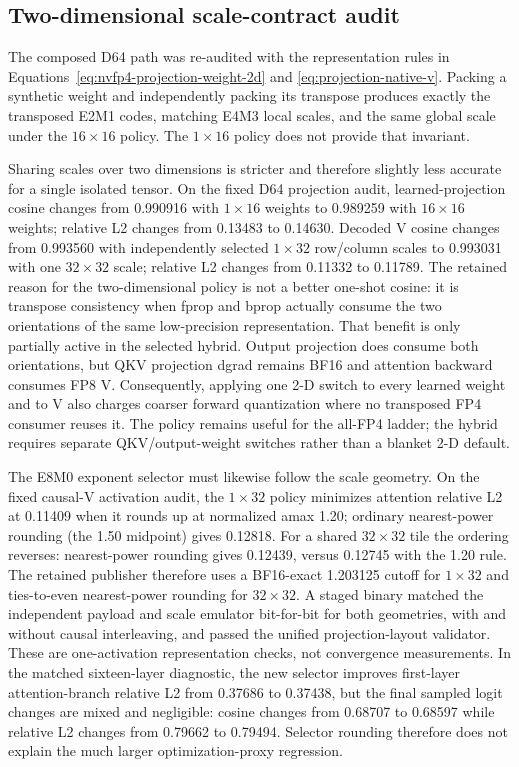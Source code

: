 \subsection{Two-dimensional scale-contract audit}

The composed D64 path was re-audited with the representation rules in
Equations~\ref{eq:nvfp4-projection-weight-2d} and
\ref{eq:projection-native-v}.  Packing a synthetic weight and independently
packing its transpose produces exactly the transposed E2M1 codes, matching
E4M3 local scales, and the same global scale under the $16\times16$ policy.
The $1\times16$ policy does not provide that invariant.

Sharing scales over two dimensions is stricter and therefore slightly less
accurate for a single isolated tensor.  On the fixed D64 projection audit,
learned-projection cosine changes from 0.990916 with $1\times16$ weights to
0.989259 with $16\times16$ weights; relative L2 changes from 0.13483 to
0.14630.  Decoded V cosine changes from 0.993560 with independently selected
$1\times32$ row/column scales to 0.993031 with one $32\times32$ scale;
relative L2 changes from 0.11332 to 0.11789.  The retained reason for the
two-dimensional policy is not a better one-shot cosine: it is transpose
consistency when fprop and bprop actually consume the two orientations of the
same low-precision representation.  That benefit is only partially active in
the selected hybrid.  Output projection does consume both orientations, but
QKV projection dgrad remains BF16 and attention backward consumes FP8 V.
Consequently, applying one 2-D switch to every learned weight and to V also
charges coarser forward quantization where no transposed FP4 consumer reuses
it.  The policy remains useful for the all-FP4 ladder; the hybrid requires
separate QKV/output-weight switches rather than a blanket 2-D default.

The E8M0 exponent selector must likewise follow the scale geometry.  On the
fixed causal-V activation audit, the $1\times32$ policy minimizes attention
relative L2 at 0.11409 when it rounds up at normalized amax 1.20; ordinary
nearest-power rounding (the 1.50 midpoint) gives 0.12818.  For a shared
$32\times32$ tile the ordering reverses: nearest-power rounding gives 0.12439,
versus 0.12745 with the 1.20 rule.  The retained publisher therefore uses a
BF16-exact 1.203125 cutoff for $1\times32$ and ties-to-even nearest-power
rounding for $32\times32$.  A staged binary matched the independent payload
and scale emulator bit-for-bit for both geometries, with and without causal
interleaving, and passed the unified projection-layout validator.  These are
one-activation representation checks, not convergence measurements.  In the
matched sixteen-layer diagnostic, the new selector improves first-layer
attention-branch relative L2 from 0.37686 to 0.37438, but the final sampled
logit changes are mixed and negligible: cosine changes from 0.68707 to
0.68597 while relative L2 changes from 0.79662 to 0.79494.  Selector rounding
therefore does not explain the much larger optimization-proxy regression.

